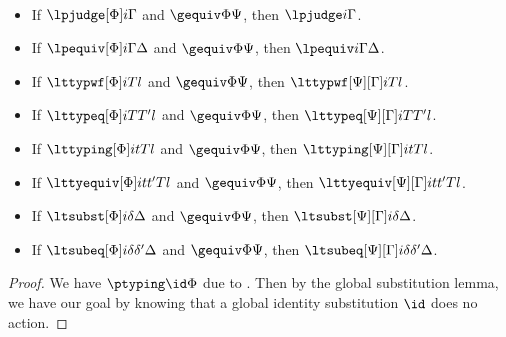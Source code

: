 \begin{lemma}$ $
  \begin{itemize}
  \item If $\lpjudge[\Phi] i \Gamma$ and $\gequiv\Phi\Psi$, then $\lpjudge i {\Gamma}$.
  \item If $\lpequiv[\Phi] i \Gamma \Delta$ and $\gequiv\Phi\Psi$, then $\lpequiv i {\Gamma}{\Delta}$.
  \item If $\lttypwf[\Phi]i T l$ and $\gequiv\Phi\Psi$, then
    $\lttypwf[\Psi][\Gamma] i{T} l$.
  \item If $\lttypeq[\Phi]i T{T'} l$ and $\gequiv\Phi\Psi$, then
    $\lttypeq[\Psi][\Gamma] i{T}{T'} l$.
  \item If $\lttyping[\Phi]i t T l$ and $\gequiv\Phi\Psi$, then
    $\lttyping[\Psi][\Gamma] i{t}{T} l$.
  \item If $\lttyequiv[\Phi]i t{t'} T l$ and $\gequiv\Phi\Psi$, then
    $\lttyequiv[\Psi][\Gamma] i{t}{t'}{T} l$.
  \item If $\ltsubst[\Phi] i{\delta}{\Delta}$ and $\gequiv\Phi\Psi$, then
    $\ltsubst[\Psi][\Gamma] i{\delta}{\Delta}$.
  \item If $\ltsubeq[\Phi] i{\delta}{\delta'}{\Delta}$ and $\gequiv\Phi\Psi$, then
    $\ltsubeq[\Psi][\Gamma] i{\delta}{\delta'}{\Delta}$.
  \end{itemize}
\end{lemma}
\begin{proof}
  We have $\ptyping\id\Phi$ due to . %
  Then by the global substitution lemma, we have our goal by knowing that a global
  identity substitution $\id$ does no action. 
\end{proof}

